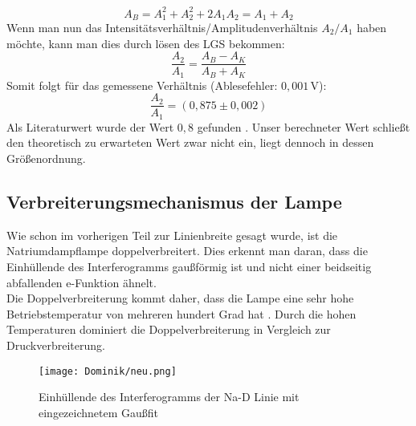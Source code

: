 \begin{equation}
    A_B=A_1^2+A_2^2+2A_1A_2=A_1+A_2
\end{equation}
Wenn man nun das Intensitätsverhältnis/Amplitudenverhältnis $A_2/A_1$ haben möchte, kann man dies durch lösen des LGS bekommen:
\begin{equation}
    \frac{A_2}{A_1}=\frac{A_B-A_K}{A_B+A_K}
\end{equation}
Somit folgt für das gemessene Verhältnis (Ablesefehler: $0,001\,\text{V}$): %
\begin{equation}
    \frac{A_2}{A_1}=\left(0,875\pm0,002\right)%
\end{equation}
Als Literaturwert wurde der Wert $0,8$ gefunden \citep[vgl.][S. 92]{Zusatzliteratur}.
Unser berechneter Wert schließt den theoretisch zu erwarteten Wert zwar nicht ein, liegt dennoch in dessen Größenordnung.
\subsection{Verbreiterungsmechanismus der Lampe}
Wie schon im vorherigen Teil zur Linienbreite gesagt wurde, ist die Natriumdampflampe doppelverbreitert.
Dies erkennt man daran, dass die Einhüllende des Interferogramms gaußförmig ist und nicht einer beidseitig abfallenden e-Funktion ähnelt.\\
Die Doppelverbreiterung kommt daher, dass die Lampe eine sehr hohe Betriebstemperatur von mehreren hundert Grad hat \citep[vgl.][]{Na-Dampf-Wiki}.
Durch die hohen Temperaturen dominiert die Doppelverbreiterung in Vergleich zur Druckverbreiterung.
\begin{figure}[h]
    \centering\texttt{[image: Dominik/neu.png]}
    \caption{Einhüllende des Interferogramms der Na-D Linie mit eingezeichnetem Gaußfit}
    \label{abbildung_ein}
\end{figure}
\newpage